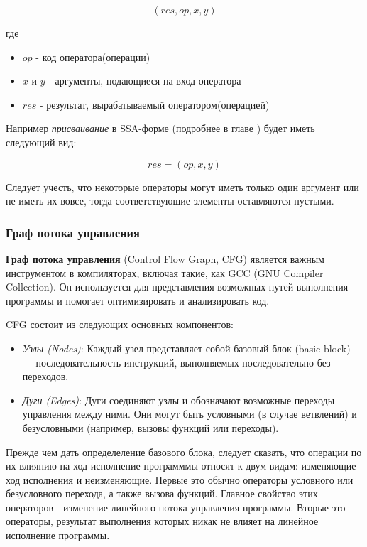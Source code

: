 \begin{equation}
    (res, op, x, y)
\end{equation}

где
\begin{itemize}
    \item $op$ - код оператора(операции)
    \item $x$ и $y$ - аргументы, подающиеся на вход оператора
    \item $res$ - результат, вырабатываемый оператором(операцией)
\end{itemize}

Например \textit{присваивание} в SSA-форме (подробнее в главе \todo[глава]) будет иметь следующий вид:

\begin{equation}
    res = (op, x, y)
\end{equation}

Следует учесть, что некоторые операторы могут иметь только один аргумент или не иметь их вовсе, тогда соответствующие элементы оставляются пустыми.

\subsubsection{Граф потока управления}

\textbf{Граф потока управления} (Control Flow Graph, CFG) является важным инструментом в компиляторах, включая такие, как GCC (GNU Compiler Collection). Он используется для представления возможных путей выполнения программы и помогает оптимизировать и анализировать код.

CFG состоит из следующих основных компонентов:

\begin{itemize}
    \item \textit{Узлы (Nodes)}: Каждый узел представляет собой базовый блок (basic block) — последовательность инструкций, выполняемых последовательно без переходов.
    \item \textit{Дуги (Edges)}: Дуги соединяют узлы и обозначают возможные переходы управления между ними. Они могут быть условными (в случае ветвлений) и безусловными (например, вызовы функций или переходы).
\end{itemize}

Прежде чем дать определеление базового блока, следует сказать, что операции по их влиянию на ход исполнение программмы относят к двум видам: изменяющие ход исполнения и неизменяющие. Первые это обычно операторы условного или безусловного перехода, а также вызова функций. Главное свойство этих операторов - изменение линейного потока управления программы. Вторые это операторы, результат выполнения которых никак не влияет на линейное исполнение программы.

